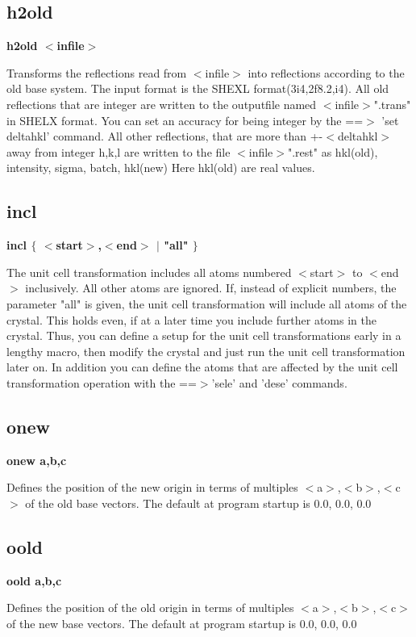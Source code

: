 \subsection*{h2old}
{\bf h2old $ <$infile$> $ \par }
\par
\vspace{3pt}
Transforms the reflections read from $ <$infile$> $ into reflections according 
to the old base system. The input format is the SHEXL format(3i4,2f8.2,i4). 
All old reflections that are integer are written to the outputfile 
named $ <$infile$> $".trans" in SHELX format. You can set an accuracy for 
being integer by the ==$> $ 'set deltahkl' command. All other reflections, 
that are more than +-$ <$deltahkl$> $ away from integer h,k,l are written to 
the file $ <$infile$> $".rest" as hkl(old), intensity, sigma, batch, hkl(new) 
Here hkl(old) are real values. 
\subsection*{incl}
{\bf incl $ \{$ $ <$start$> $,$ <$end$> $ $| $ "all" $\} $ \par }
\par
\vspace{3pt}
The unit cell transformation includes all atoms numbered $ <$start$> $ to $ <$end$> $ 
inclusively. All other atoms are ignored. 
If, instead of explicit numbers, the parameter "all" is given, the 
unit cell transformation will include all atoms of the crystal. This holds 
even, if at a later time you include further atoms in the crystal. 
Thus, you can define a setup for the unit cell transformations early in a 
lengthy macro, then modify the crystal and just run the 
unit cell transformation later on. 
In addition you can define the atoms that are affected by the 
unit cell transformation operation with the ==$> $'sele' and 'dese' commands. 
\subsection*{onew}
{\bf onew a,b,c \par }
\par
\vspace{3pt}
Defines the position of the new origin in terms of multiples $ <$a$> $,$ <$b$> $,$ <$c$> $ 
of the old base vectors. The default at program startup is 0.0, 0.0, 0.0 
\subsection*{oold}
{\bf oold a,b,c \par }
\par
\vspace{3pt}
Defines the position of the old origin in terms of multiples $ <$a$> $,$ <$b$> $,$ <$c$> $ 
of the new base vectors. The default at program startup is 0.0, 0.0, 0.0 
